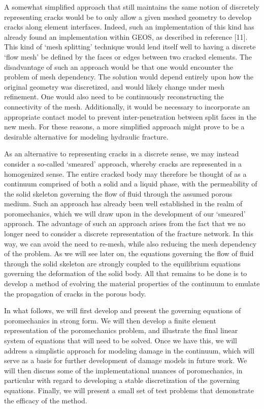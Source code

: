 \documentclass[11pt]{article} %
\begin{document}
A somewhat simplified approach that still maintains the same notion of discretely representing cracks would be to only allow a given meshed geometry to develop cracks along element interfaces. Indeed, such an implementation of this kind has already found an implementation within GEOS, as described in reference [11]. This kind of `mesh splitting' technique would lend itself well to having a discrete `flow mesh' be defined by the faces or edges between two cracked elements. The disadvantage of such an approach would be that one would encounter the problem of mesh dependency. The solution would depend entirely upon how the original geometry was discretized, and would likely change under mesh refinement. One would also need to be continuously reconstructing the connectivity of the mesh. Additionally, it would be necessary to incorporate an appropriate contact model to prevent inter-penetration between split faces in the new mesh. For these reasons, a more simplified approach might prove to be a desirable alternative for modeling hydraulic fracture.

As an alternative to representing cracks in a discrete sense, we may instead consider a so-called `smeared' approach, whereby cracks are represented in a homogenized sense. The entire cracked body may therefore be thought of as a continuum comprised of both a solid and a liquid phase, with the permeability of the solid skeleton governing the flow of fluid through the assumed porous medium. Such an approach has already been well established in the realm of poromechanics, which we will draw upon in the development of our `smeared' approach. The advantage of such an approach arises from the fact that we no longer need to consider a discrete representation of the fracture network. In this way, we can avoid the need to re-mesh, while also reducing the mesh dependency of the problem. As we will see later on, the equations governing the flow of fluid through the solid skeleton are strongly coupled to the equilibrium equations governing the deformation of the solid body. All that remains to be done is to develop a method of evolving the material properties of the continuum to emulate the propagation of cracks in the porous body.

In what follows, we will first develop and present the governing equations of poromechanics in strong form. We will then develop a finite element representation of the poromechanics problem, and illustrate the final linear system of equations that will need to be solved. Once we have this, we will address a simplistic approach for modeling damage in the continuum, which will serve as a basis for further development of damage models in future work. We will then discuss some of the implementational nuances of poromechanics, in particular with regard to developing a stable discretization of the governing equations. Finally, we will present a small set of test problems that demonstrate the efficacy of the method.
\end{document}
